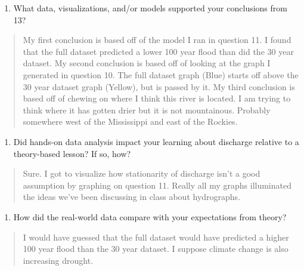 \documentclass[]{article}
\providecommand{\tightlist}{%
  \setlength{\itemsep}{0pt}\setlength{\parskip}{0pt}}
\begin{document}
\begin{enumerate}
\def\labelenumi{\arabic{enumi}.}
\setcounter{enumi}{13}
\tightlist
\item
  What data, visualizations, and/or models supported your conclusions
  from 13?
\end{enumerate}

\begin{quote}
My first conclusion is based off of the model I ran in question 11. I
found that the full dataset predicted a lower 100 year flood than did
the 30 year dataset. My second conclusion is based off of looking at the
graph I generated in question 10. The full dataset graph (Blue) starts
off above the 30 year dataset graph (Yellow), but is passed by it. My
third conclusion is based off of chewing on where I think this river is
located. I am trying to think where it has gotten drier but it is not
mountainous. Probably somewhere west of the Mississippi and east of the
Rockies.
\end{quote}

\begin{enumerate}
\def\labelenumi{\arabic{enumi}.}
\setcounter{enumi}{14}
\tightlist
\item
  Did hands-on data analysis impact your learning about discharge
  relative to a theory-based lesson? If so, how?
\end{enumerate}

\begin{quote}
Sure. I got to visualize how stationarity of discharge isn't a good
assumption by graphing on question 11. Really all my graphs illuminated
the ideas we've been discussing in class about hydrographs.
\end{quote}

\begin{enumerate}
\def\labelenumi{\arabic{enumi}.}
\setcounter{enumi}{15}
\tightlist
\item
  How did the real-world data compare with your expectations from
  theory?
\end{enumerate}

\begin{quote}
I would have guessed that the full dataset would have predicted a higher
100 year flood than the 30 year dataset. I suppose climate change is
also increasing drought.
\end{quote}
\end{document}
